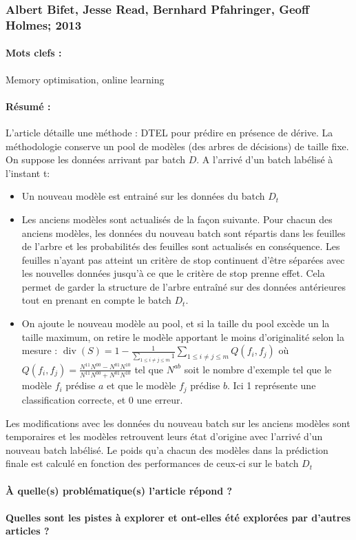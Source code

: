 \documentclass[11pt,a4paper]{report}
\begin{document}
\subsubsection{Albert Bifet, Jesse Read, Bernhard Pfahringer, Geoff Holmes; 2013}

\paragraph{Mots clefs :}Memory optimisation, online learning 

\paragraph{Résumé :} L'article détaille une méthode : DTEL pour prédire en présence de dérive. La méthodologie conserve un pool de modèles (des arbres de décisions) de taille fixe. On suppose les données arrivant par batch $D$. 
A l'arrivé d'un batch labélisé à l'instant t: 
\begin{itemize}
	\item Un nouveau modèle est entrainé sur les données du batch $D_t$
	\item Les anciens modèles sont actualisés de la façon suivante. Pour chacun des anciens modèles, les données du nouveau batch sont répartis dans les feuilles de l'arbre et les probabilités des feuilles sont actualisés en conséquence. Les feuilles n'ayant pas atteint un critère de stop continuent d'être séparées avec les nouvelles données jusqu'à ce que le critère de stop prenne effet. Cela permet de garder la structure de l'arbre entraîné sur des données antérieures tout en prenant en compte le batch $D_t$.
	\item  On ajoute le nouveau modèle au pool, et si la taille du pool excède un la taille maximum, on retire le modèle apportant le moins d'originalité selon la mesure : $\operatorname{div}(S)=1-\frac{1}{\sum_{1 \leq i \neq j \leq m} 1} \sum_{1 \leq i \neq j \leq m} Q\left(f_{i}, f_{j}\right)$ où $Q\left(f_{i}, f_{j}\right)=\frac{N^{11} N^{00}-N^{01} N^{10}}{N^{11} N^{00}+N^{01} N^{10}}$ tel que $N^{ab}$ soit le nombre d'exemple tel que le modèle $f_i$ prédise $a$ et que le modèle $f_j$ prédise $b$. Ici 1 représente une classification correcte, et 0 une erreur.
\end{itemize}

Les  modifications avec les données du nouveau batch sur les anciens modèles sont temporaires et les modèles retrouvent leurs état d'origine avec l'arrivé d'un nouveau batch labélisé. Le poids qu'a chacun des modèles dans la prédiction finale est calculé en fonction des performances de ceux-ci sur le batch $D_t$

\paragraph{À quelle(s) problématique(s) l'article répond ?} 

\paragraph{Quelles sont les pistes à explorer et ont-elles  été explorées par d'autres articles ?} 




\newpage
\end{document}
